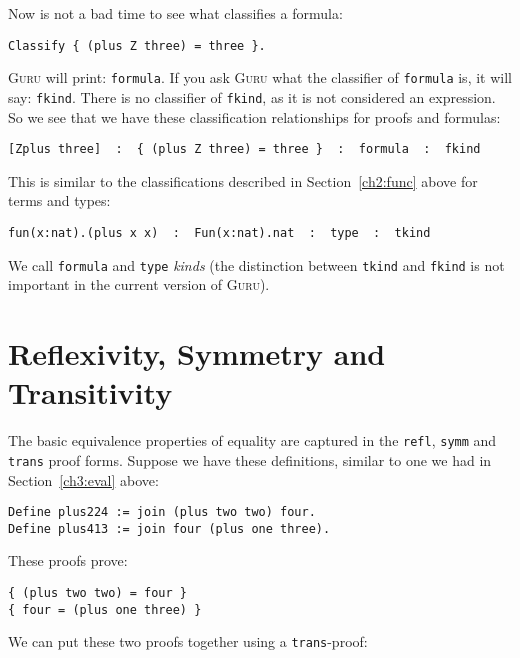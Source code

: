 \documentclass{book}[12pt]
\newcommand{\guru}[0]{\textsc{Guru}\xspace}
\begin{document}
Now is not a bad time to see what classifies a formula:

\begin{verbatim}
Classify { (plus Z three) = three }.
\end{verbatim}

\noindent \guru will print: \texttt{formula}.  If you ask \guru what
the classifier of \texttt{formula} is, it will say: \texttt{fkind}.
There is no classifier of \texttt{fkind}, as it is not considered an
expression.  So we see that we have these classification relationships
for proofs and formulas:

\begin{verbatim}
[Zplus three]  :  { (plus Z three) = three }  :  formula  :  fkind
\end{verbatim} 

\noindent This is similar to the classifications described in
Section~\ref{ch2:func} above for terms and types:

\begin{verbatim}
fun(x:nat).(plus x x)  :  Fun(x:nat).nat  :  type  :  tkind
\end{verbatim} 

 \noindent We call \texttt{formula} and \texttt{type} \emph{kinds}
(the distinction between \texttt{tkind} and \texttt{fkind} is not
important in the current version of \guru).  

\section{Reflexivity, Symmetry and Transitivity}
\label{ch3:equiv}

The basic equivalence properties of equality are captured in the
\texttt{refl}, \texttt{symm} and \texttt{trans} proof forms.  Suppose
we have these definitions, similar to one we had in
Section~\ref{ch3:eval} above:

\begin{verbatim}
Define plus224 := join (plus two two) four.
Define plus413 := join four (plus one three).
\end{verbatim}

\noindent These proofs prove:

\begin{verbatim}
{ (plus two two) = four }
{ four = (plus one three) }
\end{verbatim}

\noindent We can put these two proofs together using a \texttt{trans}-proof:
\end{document}

